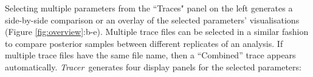 \documentclass{bioinfo}
\newcommand{\tracer}{\emph{Tracer}}
\begin{document}

Selecting multiple parameters from the ``Traces" panel on the left generates a side-by-side comparison or an overlay of the selected parameters' visualisations (Figure \ref{fig:overview}:b-e).
Multiple trace files can be selected in a similar fashion to compare posterior samples between different replicates of an analysis.
If multiple trace files have the same file name,  then a ``Combined'' trace appears automatically.
\tracer\ generates four display panels for the selected parameters:
\end{document}
